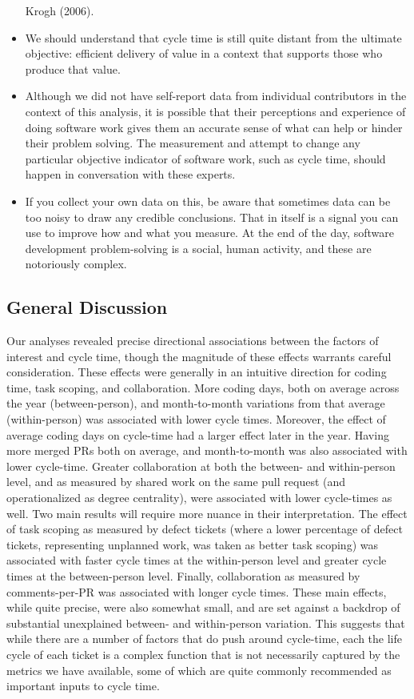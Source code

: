 \documentclass[
]{article}
\begin{document}
\begin{itemize}
  Krogh (2006).
\item
  We should understand that cycle time is still quite distant from the
  ultimate objective: efficient delivery of value in a context that
  supports those who produce that value.
\item
  Although we did not have self-report data from individual contributors
  in the context of this analysis, it is possible that their perceptions
  and experience of doing software work gives them an accurate sense of
  what can help or hinder their problem solving. The measurement and
  attempt to change any particular objective indicator of software work,
  such as cycle time, should happen in conversation with these experts.
\item
  If you collect your own data on this, be aware that sometimes data can
  be too noisy to draw any credible conclusions. That in itself is a
  signal you can use to improve how and what you measure. At the end of
  the day, software development problem-solving is a social, human
  activity, and these are notoriously complex.
\end{itemize}

\subsection{General Discussion}\label{general-discussion}

Our analyses revealed precise directional associations between the
factors of interest and cycle time, though the magnitude of these
effects warrants careful consideration. These effects were generally in
an intuitive direction for coding time, task scoping, and collaboration.
More coding days, both on average across the year (between-person), and
month-to-month variations from that average (within-person) was
associated with lower cycle times. Moreover, the effect of average
coding days on cycle-time had a larger effect later in the year. Having
more merged PRs both on average, and month-to-month was also associated
with lower cycle-time. Greater collaboration at both the between- and
within-person level, and as measured by shared work on the same pull
request (and operationalized as degree centrality), were associated with
lower cycle-times as well. Two main results will require more nuance in
their interpretation. The effect of task scoping as measured by defect
tickets (where a lower percentage of defect tickets, representing
unplanned work, was taken as better task scoping) was associated with
faster cycle times at the within-person level and greater cycle times at
the between-person level. Finally, collaboration as measured by
comments-per-PR was associated with longer cycle times. These main
effects, while quite precise, were also somewhat small, and are set
against a backdrop of substantial unexplained between- and within-person
variation. This suggests that while there are a number of factors that
do push around cycle-time, each the life cycle of each ticket is a
complex function that is not necessarily captured by the metrics we have
available, some of which are quite commonly recommended as important
inputs to cycle time.
\end{document}
